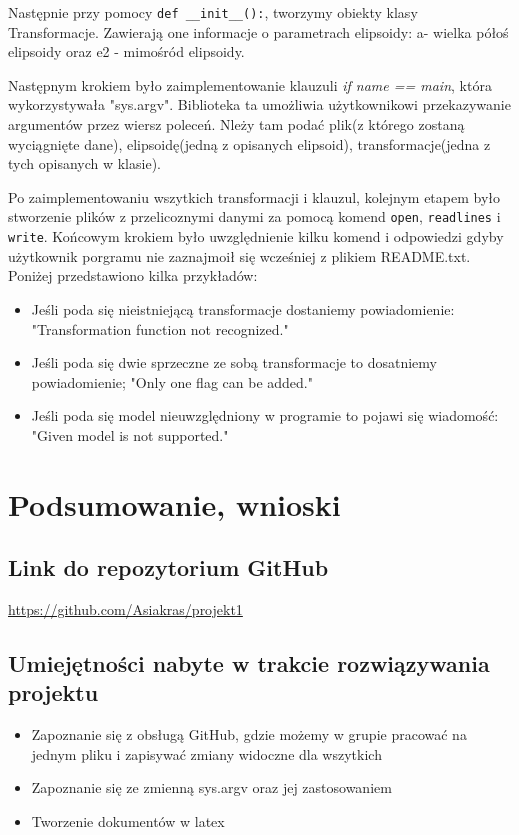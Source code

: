 \documentclass[10pt,a4paper]{article}
\begin{document}
Następnie przy pomocy \verb|def __init__():|, tworzymy  obiekty klasy Transformacje. Zawierają one informacje o parametrach elipsoidy: a- wielka półoś elipsoidy oraz e2 - mimośród elipsoidy. 
\vspace{0.5 cm}

Następnym krokiem było zaimplementowanie klauzuli \textit{if name == main}, która wykorzystywała "sys.argv". Biblioteka ta umożliwia użytkownikowi przekazywanie argumentów przez wiersz poleceń. Nleży tam podać plik(z którego zostaną wyciągnięte dane), elipsoidę(jedną z opisanych elipsoid), transformacje(jedna z tych opisanych w klasie).
\vspace{0.5 cm}

Po zaimplementowaniu wszytkich transformacji i klauzul, kolejnym etapem było stworzenie plików z przelicoznymi danymi za pomocą komend \verb|open|, \verb|readlines| i \verb|write|.\newline
Końcowym krokiem było uwzględnienie kilku komend i odpowiedzi gdyby użytkownik porgramu nie zaznajmoił się wcześniej z plikiem README.txt. Poniżej przedstawiono kilka przykładów:
\begin{itemize}
	
	\item Jeśli poda się nieistniejącą transformacje dostaniemy powiadomienie: "Transformation function not recognized."
	\item Jeśli poda się dwie sprzeczne ze sobą transformacje to dosatniemy powiadomienie; "Only one flag can be added."
	\item Jeśli poda się model nieuwzględniony w programie to pojawi się wiadomość: "Given model is not supported."
\end{itemize}

\section{Podsumowanie, wnioski}
\subsection{Link do repozytorium GitHub}
\href{https://github.com/Asiakras/projekt1}{https://github.com/Asiakras/projekt1}

\subsection{Umiejętności nabyte w trakcie rozwiązywania projektu}
\begin{itemize}
	\item Zapoznanie się z obsługą GitHub, gdzie możemy w grupie pracować na jednym pliku i zapisywać zmiany widoczne dla wszytkich
	\item Zapoznanie się ze zmienną sys.argv oraz jej zastosowaniem
	\item Tworzenie dokumentów w latex
\end{itemize}
\end{document}
